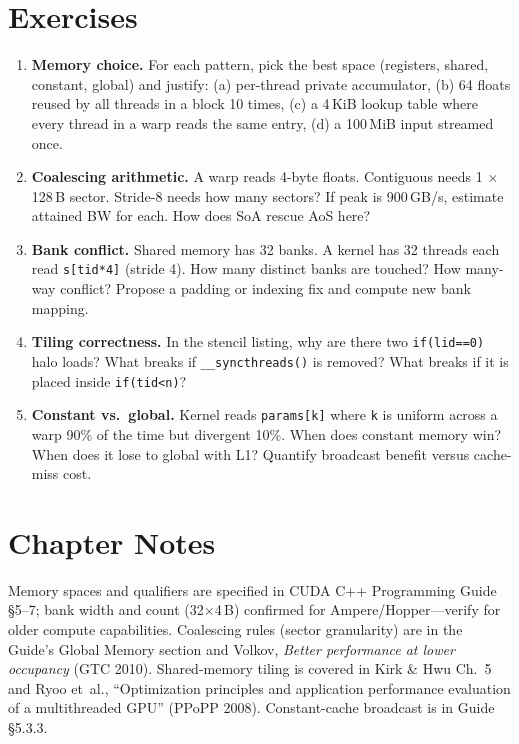 \section{Exercises}
\label{sec:ch03-exercises}
\begin{enumerate}[label=E3.\arabic*, leftmargin=*, itemsep=0.6em]
    \item \textbf{Memory choice.} For each pattern, pick the best space (registers, shared, constant, global) and justify: (a) per-thread private accumulator, (b) 64 floats reused by all threads in a block 10 times, (c) a 4\,KiB lookup table where every thread in a warp reads the same entry, (d) a 100\,MiB input streamed once.
    \item \textbf{Coalescing arithmetic.} A warp reads 4-byte floats. Contiguous needs 1 $\times$ 128\,B sector. Stride-8 needs how many sectors? If peak is 900\,GB/s, estimate attained BW for each. How does SoA rescue AoS here?
    \item \textbf{Bank conflict.} Shared memory has 32 banks. A kernel has 32 threads each read \texttt{s[tid*4]} (stride 4). How many distinct banks are touched? How many-way conflict? Propose a padding or indexing fix and compute new bank mapping.
    \item \textbf{Tiling correctness.} In the stencil listing, why are there two \texttt{if(lid==0)} halo loads? What breaks if \texttt{\_\_syncthreads()} is removed? What breaks if it is placed inside \texttt{if(tid<n)}?
    \item \textbf{Constant vs.\ global.} Kernel reads \texttt{params[k]} where \texttt{k} is uniform across a warp 90\% of the time but divergent 10\%. When does constant memory win? When does it lose to global with L1? Quantify broadcast benefit versus cache-miss cost.
\end{enumerate}

\section*{Chapter Notes}
Memory spaces and qualifiers are specified in CUDA C++ Programming Guide \S5--7; bank width and count (32$\times$4\,B) confirmed for Ampere/Hopper---verify for older compute capabilities. Coalescing rules (sector granularity) are in the Guide's Global Memory section and Volkov, \emph{Better performance at lower occupancy} (GTC 2010). Shared-memory tiling is covered in Kirk \& Hwu Ch.~5 and Ryoo et~al., ``Optimization principles and application performance evaluation of a multithreaded GPU'' (PPoPP 2008). Constant-cache broadcast is in Guide \S5.3.3.
